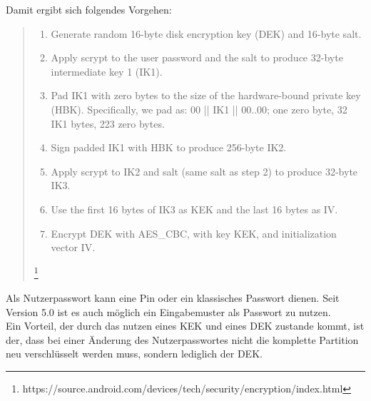 	Damit ergibt sich folgendes Vorgehen:
	\begin{quote}
		\begin{enumerate}
		   \item Generate random 16-byte disk encryption key (DEK) and 16-byte salt.
		   \item Apply scrypt to the user password and the salt to produce 32-byte intermediate key 1 (IK1).
		   \item Pad IK1 with zero bytes to the size of the hardware-bound private key (HBK). Specifically, we pad as: 00 || IK1 || 00..00; one zero byte, 32 IK1 bytes, 223 zero bytes.
		   \item Sign padded IK1 with HBK to produce 256-byte IK2.
		   \item Apply scrypt to IK2 and salt (same salt as step 2) to produce 32-byte IK3.
		   \item Use the first 16 bytes of IK3 as KEK and the last 16 bytes as IV.
		   \item Encrypt DEK with AES\_CBC, with key KEK, and initialization vector IV. 
	   \end{enumerate}
	   \footnote{https://source.android.com/devices/tech/security/encryption/index.html}
	\end{quote}
	Als Nutzerpasswort kann eine Pin oder ein klassisches Passwort dienen. Seit Version 5.0 ist es auch möglich ein Eingabemuster als Passwort zu nutzen. \\
	Ein Vorteil, der durch das nutzen eines KEK und eines DEK zustande kommt, ist der, dass bei einer Änderung des Nutzerpasswortes nicht die komplette Partition neu verschlüsselt werden muss, sondern lediglich der DEK.

	